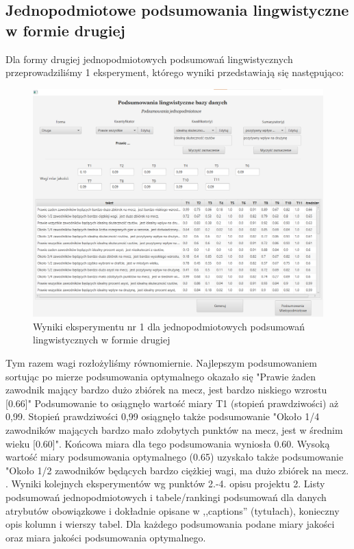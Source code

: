 \documentclass{classrep}
\begin{document}
\subsection{Jednopodmiotowe podsumowania lingwistyczne w formie drugiej}

Dla formy drugiej jednopodmiotowych podsumowań lingwistycznych przeprowadziliśmy 1 eksperyment, którego wyniki przedstawiają się następująco:
\begin{figure}[H]
    \centering
    \includegraphics[width = 14cm]{eksperyment3.png}
    \caption{Wyniki eksperymentu nr 1 dla jednopodmiotowych podsumowań lingwistycznych w formie drugiej}
    \label{rysunek:forma_druga_eksperyment_1}
\end{figure}

Tym razem wagi rozłożyliśmy równomiernie. Najlepszym podsumowaniem sortując po mierze podsumowania optymalnego okazało się "Prawie żaden zawodnik mający bardzo dużo zbiórek na mecz, jest bardzo niskiego wzrostu [0.66]" Podsumowanie to osiągnęło wartość miary T1 (stopień prawdziwości) aż 0,99. Stopień prawdziwości 0,99 osiągnęło także podsumowanie "Około 1/4 zawodników mających bardzo mało zdobytych punktów na mecz, jest w średnim wieku [0.60]". Końcowa miara dla tego podsumowania wyniosła 0.60. Wysoką wartość miary podsumowania optymalnego (0.65) uzyskało także podsumowanie "Około 1/2 zawodników będących bardzo ciężkiej wagi, ma dużo zbiórek na mecz.
.
Wyniki kolejnych eksperymentów wg punktów 2.-4. opisu projektu 2.  Listy podsumowań
jednopodmiotowych i tabele/rankingi podsumowań dla danych atrybutów obowiązkowe i dokładnie opisane w ,,captions'' (tytułach), konieczny opis kolumn i wierszy tabel. Dla każdego podsumowania podane miary jakości oraz miara jakości podsumowania
optymalnego.\\
\end{document}
